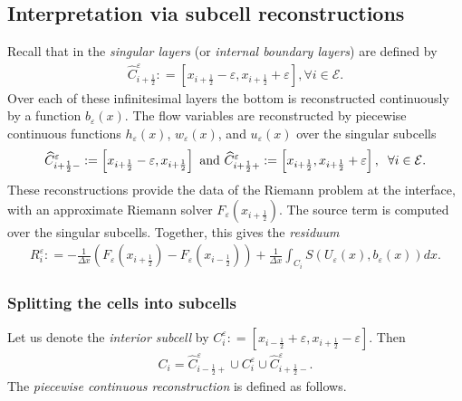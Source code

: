 \documentclass[11pt,a4paper,center,notitlepage]{article}
\numberwithin{equation}{section}
\begin{document}
\subsection{Interpretation via subcell reconstructions}
Recall that in \cite{Chen2017} the \textit{singular layers} (or \textit{internal boundary layers}) are defined by
\begin{align}
\widehat C_{i + \frac{1}{2}}^\varepsilon : = \left[ {{x_{i + \frac{1}{2}}} - \varepsilon ,{x_{i + \frac{1}{2}}} + \varepsilon } \right],\forall i \in \mathcal{E}.
\end{align}
Over each of these infinitesimal layers the bottom is reconstructed continuously by a function $b_\varepsilon \left(x\right)$. The flow variables are reconstructed by piecewise continuous functions $h_\varepsilon \left(x\right)$, $w_\varepsilon \left(x\right)$, and $u_\varepsilon \left(x\right)$ over the singular subcells
\begin{align}
\widehat C_{i + \frac{1}{2} - }^\varepsilon : = \left[ {{x_{i + \frac{1}{2}}} - \varepsilon ,{x_{i + \frac{1}{2}}}} \right] \mbox{ and } \widehat C_{i + \frac{1}{2} + }^\varepsilon : = \left[ {{x_{i + \frac{1}{2}}},{x_{i + \frac{1}{2}}} + \varepsilon } \right], \hspace{2mm} \forall i \in \mathcal{E}.
\end{align}
These reconstructions provide the data of the Riemann problem at the interface, with an approximate Riemann solver $F_\varepsilon \left(x_{i+\frac{1}{2}}\right)$. The source term is computed over the singular subcells. Together, this gives the \textit{residuum}
\begin{align}
R_i^\varepsilon : =  - \frac{1}{{\Delta x}}\left( {{F_\varepsilon }\left( {{x_{i + \frac{1}{2}}}} \right) - {F_\varepsilon }\left( {{x_{i - \frac{1}{2}}}} \right)} \right) + \frac{1}{{\Delta x}}\int_{{C_i}} {S\left( {{U_\varepsilon }\left( x \right),{b_\varepsilon }\left( x \right)} \right)dx} .
\end{align}

\subsubsection{Splitting the cells into subcells}
Let us denote the \textit{interior subcell} by $C_i^\varepsilon : = \left[ {{x_{i - \frac{1}{2}}} + \varepsilon ,{x_{i + \frac{1}{2}}} - \varepsilon } \right]$. Then
\begin{align}
{C_i} = \widehat C_{i - \frac{1}{2} + }^\varepsilon  \cup C_i^\varepsilon  \cup \widehat C_{i + \frac{1}{2} - }^\varepsilon .
\end{align}
The \textit{piecewise continuous reconstruction} is defined as follows.
\end{document}
